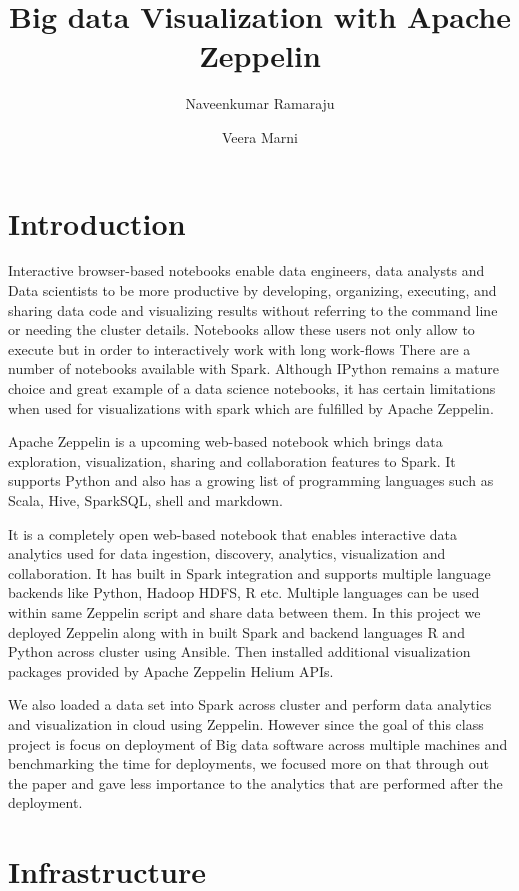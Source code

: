 \documentclass[9pt,twocolumn,twoside]{../../styles/osajnl}
\title{Big data Visualization with Apache Zeppelin}
\author[1, *]{Naveenkumar Ramaraju}
\author[1,*]{Veera Marni}
\affil[1]{School of Informatics and Computing, Bloomington, IN 47408, 
U.S.A.}
\affil[*]{Corresponding authors: naveenkumar2703@gmail.com, 
narayana1043@gmail.com}
\begin{document}
	
	\maketitle
	
	\section{Introduction}
	
	Interactive browser-based notebooks enable data engineers, data 
	analysts and Data scientists to be more productive by developing, 
	organizing, executing, and sharing data code and visualizing 
	results without referring to the command line or needing the 
	cluster details. Notebooks allow these users not only allow to 
	execute but in order to interactively work with long work-flows  
	There are a number of notebooks available with Spark. Although 
	IPython remains a mature choice and great example of a data 
	science notebooks, it has certain limitations when used for 
	visualizations with spark which are fulfilled by Apache Zeppelin. 
	
	Apache Zeppelin\cite{www-zeppelin} is a upcoming web-based 
	notebook 
	which brings data exploration, visualization, sharing and 
	collaboration features to Spark.   It supports Python and also 
	has a growing list of programming languages such as Scala, Hive, 
	SparkSQL, shell and markdown. 
	
	It is a completely open web-based notebook that enables 
	interactive data analytics used for data ingestion, discovery, 
	analytics, visualization and collaboration. It has built in Spark 
	integration and supports multiple language backends like Python, 
	Hadoop HDFS, R etc.  Multiple languages can be used within same 
	Zeppelin script and share data between them. In this project we 
	deployed Zeppelin along with in built Spark and backend 
	languages R and Python across cluster using Ansible. Then 
	installed 
	additional visualization packages provided by Apache Zeppelin 
	Helium\cite{www-helium} APIs.
	
	We also loaded a data set into Spark across cluster and 
	perform 
	data analytics and visualization in cloud using Zeppelin. However 
	since the goal of this class project is focus on deployment of 
	Big 
	data software across multiple machines and benchmarking the time 
	for 
	deployments, we focused more on that through out the 
	paper 
	and gave less importance to the analytics that are performed 
	after the deployment.
	
	\section{Infrastructure}
	
\end{document}
